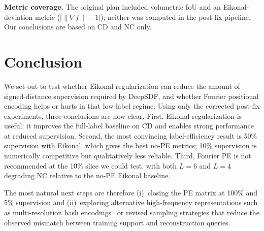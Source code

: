 \documentclass[conference]{IEEEtran}
\begin{document}
\textbf{Metric coverage.} The original plan included volumetric IoU and an Eikonal-deviation metric ($|\|\nabla f\| - 1|$); neither was computed in the post-fix pipeline. Our conclusions are based on CD and NC only.

\section{Conclusion}

We set out to test whether Eikonal regularization can reduce the amount of
signed-distance supervision required by DeepSDF, and whether Fourier positional
encoding helps or hurts in that low-label regime. Using only the corrected
post-fix experiments, three conclusions are now clear. First, Eikonal
regularization is useful: it improves the full-label baseline on CD and enables strong
performance at reduced supervision. Second, the most convincing label-efficiency
result is 50\% supervision with Eikonal, which gives the best no-PE metrics; 10\% supervision is numerically competitive but qualitatively less reliable. Third, Fourier PE is not recommended at the 10\% slice we could test, with both $L=6$ and $L=4$ degrading NC relative to the no-PE Eikonal baseline.

The most natural next steps are therefore (i)~closing the PE matrix at 100\% and 5\% supervision and (ii)~exploring alternative high-frequency representations such as multi-resolution hash encodings~\cite{instantngp} or revised sampling strategies that reduce the observed mismatch between training support and reconstruction queries.
\end{document}
